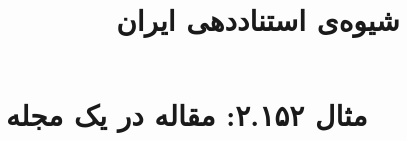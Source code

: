 \documentclass[a4paper,10pt]{article}
\begin{document}
\title{شیوه‌ی استناددهی ایران
 }
\author{}
\date{}
\maketitle



\section*{مثال ۲.۱۵۲: مقاله در یک مجله}

\cite{بهرامی1383}\\
\cite{calabrese1999}\\






\end{document}
